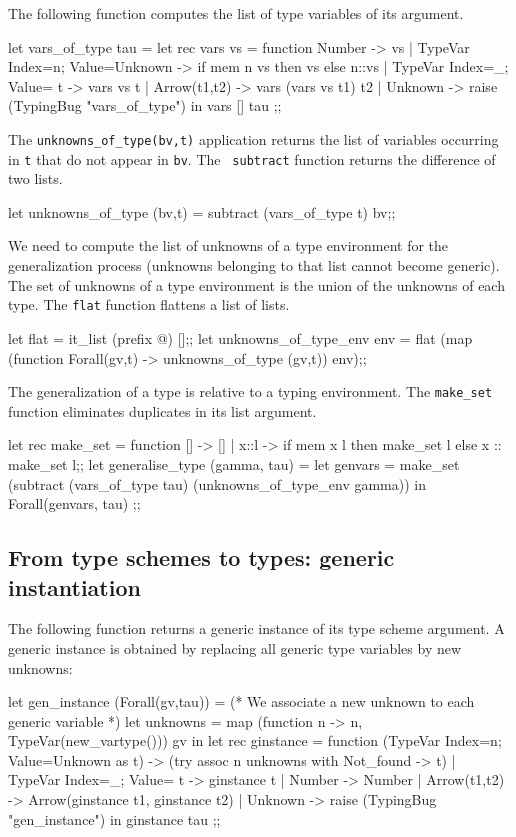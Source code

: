The following function computes the list of type variables of its argument.
\begin{caml_example}
let vars_of_type tau =
 let rec vars vs = function
       Number -> vs
     | TypeVar {Index=n; Value=Unknown}
                 -> if mem n vs then vs else n::vs
     | TypeVar {Index=_; Value= t} -> vars vs t
     | Arrow(t1,t2) -> vars (vars vs t1) t2
     | Unknown -> raise (TypingBug "vars_of_type")
  in vars [] tau
;;
\end{caml_example}
%
The \verb"unknowns_of_type(bv,t)" application returns the list of variables
occurring in {\tt t} that do not appear in {\tt bv}. The {\tt 
subtract} function returns the difference of two lists.
\begin{caml_example}
let unknowns_of_type (bv,t) =
    subtract (vars_of_type t) bv;;
\end{caml_example}
We need to compute the list of unknowns of a type environment for the
generalization process (unknowns belonging to that list cannot become
generic).
The set of unknowns of a  type environment is the union of the unknowns
of each type. The {\tt flat} function flattens a list of lists.
\begin{caml_example}
let flat = it_list (prefix @) [];;
let unknowns_of_type_env env =
    flat (map (function Forall(gv,t) -> unknowns_of_type (gv,t)) env);;
\end{caml_example}
%
The generalization of a type is relative to a typing environment.
The \verb"make_set" function eliminates duplicates in its list argument.
\begin{caml_example}
let rec make_set = function
     []  -> []
  | x::l -> if mem x l then make_set l else x :: make_set l;;
let generalise_type (gamma, tau) =
  let genvars =
        make_set (subtract (vars_of_type tau)
                           (unknowns_of_type_env gamma))
  in Forall(genvars, tau)
;;
\end{caml_example}

\subsection{From type schemes to types: generic instantiation}
%

The following function returns a generic instance of its type scheme argument.
A generic instance is obtained by replacing all generic type variables by new
unknowns:
\begin{caml_example}
let gen_instance (Forall(gv,tau)) = 
  (* We associate a new unknown to each generic variable *)
  let unknowns = map (function n -> n, TypeVar(new_vartype())) gv in
  let rec ginstance = function
        (TypeVar {Index=n; Value=Unknown} as t) ->
                    (try assoc n unknowns
                     with Not_found -> t)
      | TypeVar {Index=_; Value= t} -> ginstance t
      | Number -> Number
      | Arrow(t1,t2) -> Arrow(ginstance t1, ginstance t2)
      | Unknown -> raise (TypingBug "gen_instance")
  in ginstance tau
;;
\end{caml_example}

